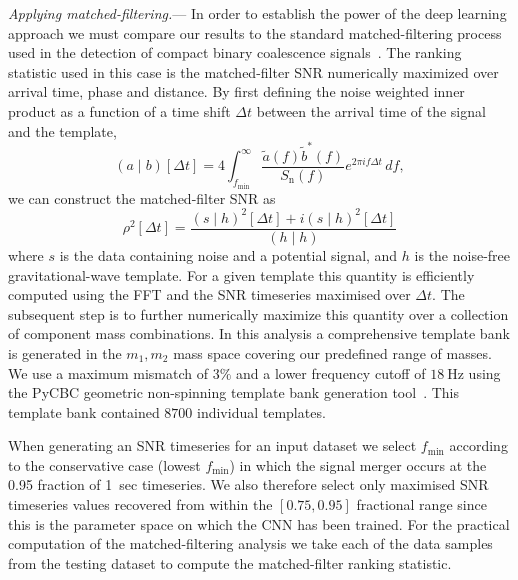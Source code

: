 \documentclass[%
showpacs,
 amsmath,amssymb,
 aps,
 twocolumn,
 prl,
 reprint,
floatfix,
]{revtex4-1}
\begin{document}
%
%
\textit{Applying matched-filtering.}---
%
%
In order to establish the power of the deep learning approach we must compare
our results to the standard matched-filtering process used in the detection of
compact binary coalescence
signals~\cite{PhysRevD.85.122006,2013PhRvD..87b4033B}. The ranking statistic
used in this case is the matched-filter \ac{SNR} numerically maximized over
arrival time, phase and distance. By first defining the noise weighted inner
product as a function of a time shift $\Delta t$ between the arrival time of
the signal and the template,
%
%
\begin{equation}\label{eq:inner}
(a\mid b)[\Delta t] =
4\int_{f_{\mathrm{min}}}^{\infty}\frac{\tilde{a}(f)\tilde{b}^{*}(f)}{S_{\mathrm{n}}(f)}e^{2\pi i
f\Delta t}\,df,
\end{equation}
%
we can construct the matched-filter \ac{SNR} as 
%
\begin{equation}
\rho^{2}[\Delta t]=\frac{(s\mid h)^{2}[\Delta t] + i(s\mid h)^{2}[\Delta t]}{(h\mid h)}
\end{equation}
%
where $s$ is the data containing noise and a potential signal, and $h$ is the
noise-free gravitational-wave template. For a given template this quantity is
efficiently computed using the \ac{FFT} and the \ac{SNR} timeseries maximised
over $\Delta t$. The subsequent step is to further numerically maximize this
quantity over a collection of component mass combinations. In this analysis a
comprehensive template bank is generated in the $m_{1},m_{2}$ mass space
covering our predefined range of masses. We use a maximum mismatch of $3\%$ and
a lower frequency cutoff of $18~\mathrm{Hz}$ using the PyCBC geometric
non-spinning template bank generation
tool~\cite{pycbc-software,0264-9381-33-21-215004}. This template bank contained
$8700$ individual templates. 

%
%
When generating an \ac{SNR} timeseries for an input dataset we select
$f_{\mathrm{min}}$ according to the conservative case (lowest
$f_{\mathrm{min}}$) in which the signal merger occurs at the 0.95 fraction of
1~sec timeseries. We also therefore select only maximised \ac{SNR} timeseries
values recovered from within the $[0.75,0.95]$ fractional range since this is
the parameter space on which the \ac{CNN} has been trained. For the practical
computation of the matched-filtering analysis we take each of the data samples
from the testing dataset to compute the matched-filter ranking statistic.
\end{document}

